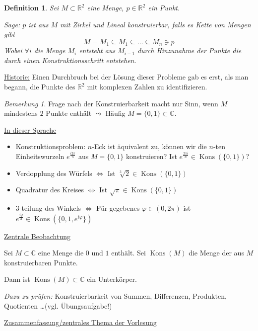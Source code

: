 \documentclass[a4paper,12pt,numbers=noenddot,parskip=full]{scrartcl}
\newcommand{\setR}{\mathbb{R}}
\newcommand{\setC}{\mathbb{C}}
\newcommand{\heading}{\underline}
\DeclareMathOperator{\Kons}{Kons}
\theoremstyle{dotless}
\newtheorem{definition}[theorem]{Definition}
\theoremstyle{remark}
\newtheorem*{remark}{Bemerkung}
\begin{document}
	\begin{definition}
		Sei $M \subset \setR^2$ eine Menge, $p \in \setR^2$ ein Punkt.
		
		Sage: $p$ ist aus $M$ mit Zirkel und Lineal konstruierbar, falls es Kette von Mengen gibt
		\begin{equation*}
			M = M_1 \subseteq M_1 \subseteq \dots \subseteq M_n \ni p
		\end{equation*}
		Wobei $\forall i$ die Menge $M_i$ entsteht aus $M_{i-1}$ durch Hinzunahme der Punkte die durch einen Konstruktionsschritt entstehen.
	\end{definition}

	\heading{Historie:} Einen Durchbruch bei der Lösung dieser Probleme gab es erst, als man begann, die Punkte des $\setR^2$ mit komplexen Zahlen zu identifizieren.
	
	\begin{remark}
		Frage nach der Konstruierbarkeit macht nur Sinn, wenn $M$ mindestens $2$ Punkte enthält $\leadsto$ Häufig $M = \{0,1\} \subset \setC$.
	\end{remark}

	\heading{In dieser Sprache}
	\begin{itemize}
		\item Konstruktionsproblem: $n$-Eck ist äquivalent zu, können wir die $n$-ten Einheitswurzeln $e^{\frac{i 2 \pi}{n}}$ aus $M = \{ 0,1 \}$ konstruieren?
		Ist $e^{\frac{2\pi i}{n}} \in \Kons(\{0,1\})$?
		\item Verdopplung des Würfels $\Leftrightarrow$ Ist $\sqrt[3]{2} \in \Kons(\{0,1\})$
		\item Quadratur des Kreises $\Leftrightarrow$ Ist $\sqrt{\pi} \in \Kons(\{0,1\})$
		\item $3$-teilung des Winkels $\Leftrightarrow$ Für gegebenes $\varphi \in (0,2\pi)$ ist $e^{\frac{i \varphi}{3}} \in \Kons(\{ 0, 1, e^{i \varphi} \})$
	\end{itemize}

	\heading{Zentrale Beobachtung}
	
	Sei $M \subset \setC$ eine Menge die $0$ und $1$ enthält. Sei $\Kons(M)$ die Menge der aus $M$ konstruierbaren Punkte.
	
	Dann ist $\Kons(M) \subset \setC$ ein Unterkörper.
	
	\textit{Dazu zu prüfen:} Konstruierbarkeit von Summen, Differenzen, Produkten, Quotienten \dots (vgl. Übungsaufgabe!)
	
	\heading{Zusammenfassung/zentrales Thema der Vorlesung}
	
\end{document}
